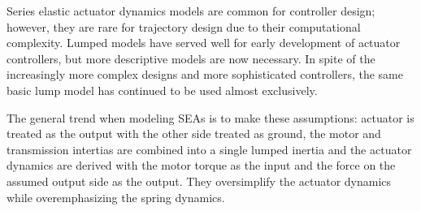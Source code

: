 Series elastic actuator dynamics models are common for controller design; however, they are rare for trajectory design due to their computational complexity. Lumped models have served well for early development of actuator controllers, but more descriptive models are now necessary. In spite of the increasingly more complex designs and more sophisticated controllers, the same basic lump model has continued to be used almost exclusively.

The general trend when modeling SEAs is to make these assumptions: actuator is treated as the output with the other side treated as ground, the motor and transmission intertias are combined into a single lumped inertia and the actuator dynamics are derived with the motor torque as the input and the force on the assumed output side as the output. They oversimplify the actuator dynamics while overemphasizing the spring dynamics. 

